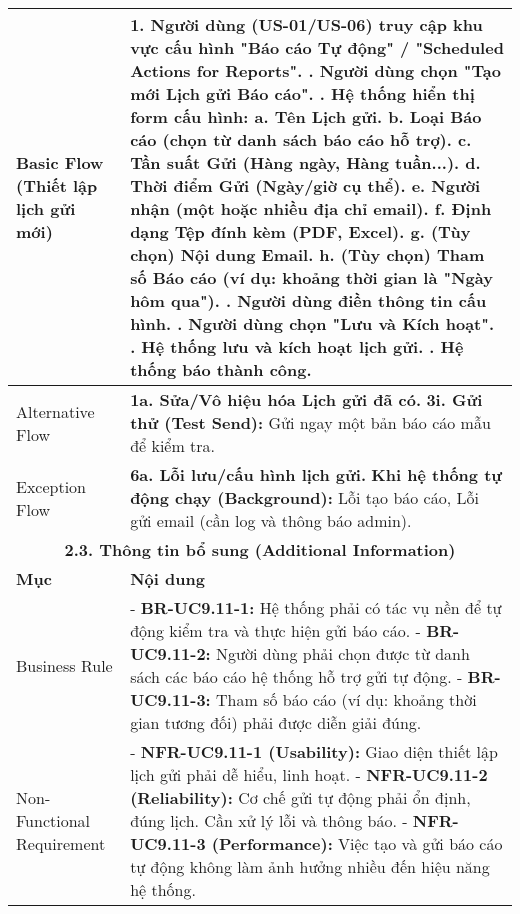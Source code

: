 \begin{longtable}{|m{4cm}|p{11cm}|}
Basic Flow (Thiết lập lịch gửi mới) & 1. Người dùng (US-01/US-06) truy cập khu vực cấu hình "Báo cáo Tự động" / "Scheduled Actions for Reports". \newline 2. Người dùng chọn "Tạo mới Lịch gửi Báo cáo". \newline 3. Hệ thống hiển thị form cấu hình: \newline    a. Tên Lịch gửi. \newline    b. Loại Báo cáo (chọn từ danh sách báo cáo hỗ trợ). \newline    c. Tần suất Gửi (Hàng ngày, Hàng tuần...). \newline    d. Thời điểm Gửi (Ngày/giờ cụ thể). \newline    e. Người nhận (một hoặc nhiều địa chỉ email). \newline    f. Định dạng Tệp đính kèm (PDF, Excel). \newline    g. (Tùy chọn) Nội dung Email. \newline    h. (Tùy chọn) Tham số Báo cáo (ví dụ: khoảng thời gian là "Ngày hôm qua"). \newline 4. Người dùng điền thông tin cấu hình. \newline 5. Người dùng chọn "Lưu và Kích hoạt". \newline 6. Hệ thống lưu và kích hoạt lịch gửi. \newline 7. Hệ thống báo thành công. \\
\hline
Alternative Flow & \textbf{1a. Sửa/Vô hiệu hóa Lịch gửi đã có.} \newline \textbf{3i. Gửi thử (Test Send):} Gửi ngay một bản báo cáo mẫu để kiểm tra. \\
\hline
Exception Flow & \textbf{6a. Lỗi lưu/cấu hình lịch gửi.} \newline \textbf{Khi hệ thống tự động chạy (Background):} Lỗi tạo báo cáo, Lỗi gửi email (cần log và thông báo admin). \\
\hline
\multicolumn{2}{|c|}{\textbf{2.3. Thông tin bổ sung (Additional Information)}} \\
\hline
\textbf{Mục} & \textbf{Nội dung} \\
\hline
Business Rule & - \textbf{BR-UC9.11-1:} Hệ thống phải có tác vụ nền để tự động kiểm tra và thực hiện gửi báo cáo. \newline - \textbf{BR-UC9.11-2:} Người dùng phải chọn được từ danh sách các báo cáo hệ thống hỗ trợ gửi tự động. \newline - \textbf{BR-UC9.11-3:} Tham số báo cáo (ví dụ: khoảng thời gian tương đối) phải được diễn giải đúng. \\
\hline
Non-Functional Requirement & - \textbf{NFR-UC9.11-1 (Usability):} Giao diện thiết lập lịch gửi phải dễ hiểu, linh hoạt. \newline - \textbf{NFR-UC9.11-2 (Reliability):} Cơ chế gửi tự động phải ổn định, đúng lịch. Cần xử lý lỗi và thông báo. \newline - \textbf{NFR-UC9.11-3 (Performance):} Việc tạo và gửi báo cáo tự động không làm ảnh hưởng nhiều đến hiệu năng hệ thống. \\
\hline
\end{longtable}